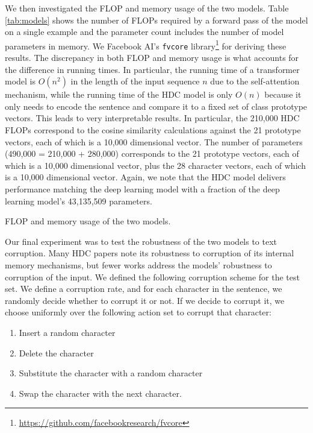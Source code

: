 \documentclass[conference]{IEEEtran}
\begin{document}
We then investigated the FLOP and memory usage of the two models. Table \ref{tab:models} shows the number of FLOPs required by a forward pass of the model on a single example and the parameter count includes the number of model parameters in memory. We Facebook AI's \verb|fvcore| library\footnote{\url{https://github.com/facebookresearch/fvcore}} for deriving these results. The discrepancy in both FLOP and memory usage is what accounts for the difference in running times. In particular, the running time of a transformer model is $O(n^2)$ in the length of the input sequence $n$ due to the self-attention mechanism, while the running time of the HDC model is only $O(n)$ because it only needs to encode the sentence and compare it to a fixed set of class prototype vectors. This leads to very interpretable results. In particular, the 210,000 HDC FLOPs correspond to the cosine similarity calculations against the 21 prototype vectors, each of which is a 10,000 dimensional vector. The number of parameters (490,000 = 210,000 + 280,000) corresponds to the 21 prototype vectors, each of which is a 10,000 dimensional vector, plus the 28 character vectors, each of which is a 10,000 dimensional vector. Again, we note that the HDC model delivers performance matching the deep learning model with a fraction of the deep learning model's 43,135,509 parameters.\\

\begin{table}[htbp]
\caption{FLOP and memory usage of the two models.}
\centering
\label{tab:models}

\end{table}

Our final experiment was to test the robustness of the two models to text corruption. Many HDC papers note its robustness to corruption of its internal memory mechanisms, but fewer works address the models' robustness to corruption of the input. We defined the following corruption scheme for the test set. We define a corruption rate, and for each character in the sentence, we randomly decide whether to corrupt it or not. If we decide to corrupt it, we choose uniformly over the following action set to corrupt that character:
\begin{enumerate}
    \item Insert a random character
    \item Delete the character
    \item Substitute the character with a random character
    \item Swap the character with the next character.
\end{enumerate}
\end{document}
